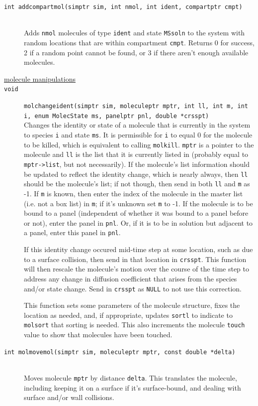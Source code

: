 \documentclass {scrbook}
\newcommand {\ttt} {\texttt}
\begin{document}
\begin{description}
\item[\ttt{int addcompartmol(simptr sim, int nmol, int ident, compartptr cmpt)}]
\hfill \\
Adds \ttt{nmol} molecules of type \ttt{ident} and state \ttt{MSsoln} to the system with random locations that are within compartment \ttt{cmpt}. Returns 0 for success, 2 if a random point cannot be found, or 3 if there aren't enough available molecules.

\item[\underline{molecule manipulations}]

\item[\ttt{void}]
\ttt{molchangeident(simptr sim, moleculeptr mptr, int ll, int m, int i, enum MolecState ms, panelptr pnl, double *crsspt)} \\
Changes the identity or state of a molecule that is currently in the system to species \ttt{i} and state \ttt{ms}. It is permissible for \ttt{i} to equal 0 for the molecule to be killed, which is equivalent to calling \ttt{molkill}. \ttt{mptr} is a pointer to the molecule and \ttt{ll} is the list that it is currently listed in (probably equal to \ttt{mptr->list}, but not necessarily). If the molecule's list information should be updated to reflect the identity change, which is nearly always, then \ttt{ll} should be the molecule's list; if not though, then send in both \ttt{ll} and \ttt{m} as -1. If \ttt{m} is known, then enter the index of the molecule in the master list (i.e. not a box list) in \ttt{m}; if it's unknown set \ttt{m} to -1. If the molecule is to be bound to a panel (independent of whether it was bound to a panel before or not), enter the panel in \ttt{pnl}. Or, if it is to be in solution but adjacent to a panel, enter this panel in \ttt{pnl}.

If this identity change occured mid-time step at some location, such as due to a surface collision, then send in that location in \ttt{crsspt}. This function will then rescale the molecule's motion over the course of the time step to address any change in diffusion coefficient that arises from the species and/or state change. Send in \ttt{crsspt} as \ttt{NULL} to not use this correction.

This function sets some parameters of the molecule structure, fixes the location as needed, and, if appropriate, updates \ttt{sortl} to indicate to \ttt{molsort} that sorting is needed. This also increments the molecule \ttt{touch} value to show that molecules have been touched.

\item[\ttt{int molmovemol(simptr sim, moleculeptr mptr, const double *delta)}]
\hfill \\
Moves molecule \ttt{mptr} by distance \ttt{delta}. This translates the molecule, including keeping it on a surface if it's surface-bound, and dealing with surface and/or wall collisions.



\end{description}
\end{document}
